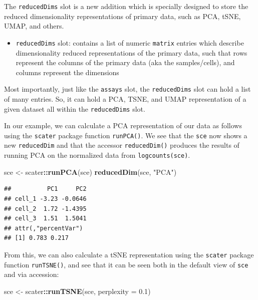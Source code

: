 \documentclass[]{book}
\newenvironment{Shaded}{\begin{snugshade}}{\end{snugshade}}
\newcommand{\DataTypeTok}[1]{\textcolor[rgb]{0.13,0.29,0.53}{#1}}
\newcommand{\FloatTok}[1]{\textcolor[rgb]{0.00,0.00,0.81}{#1}}
\newcommand{\KeywordTok}[1]{\textcolor[rgb]{0.13,0.29,0.53}{\textbf{#1}}}
\newcommand{\NormalTok}[1]{#1}
\newcommand{\OperatorTok}[1]{\textcolor[rgb]{0.81,0.36,0.00}{\textbf{#1}}}
\newcommand{\StringTok}[1]{\textcolor[rgb]{0.31,0.60,0.02}{#1}}
\providecommand{\tightlist}{%
  \setlength{\itemsep}{0pt}\setlength{\parskip}{0pt}}
\begin{document}
The \texttt{reducedDims} slot is a new addition which is specially designed to store the reduced dimensionality representations of primary data, such as PCA, tSNE, UMAP, and others.

\begin{itemize}
\tightlist
\item
  \texttt{reducedDims} slot: contains a list of numeric \texttt{matrix} entries which describe dimensionality reduced representations of the primary data, such that rows represent the columns of the primary data (aka the samples/cells), and columns represent the dimensions
\end{itemize}

Most importantly, just like the \texttt{assays} slot, the \texttt{reducedDims} slot can hold a list of many entries. So, it can hold a PCA, TSNE, and UMAP representation of a given dataset all within the \texttt{reducedDims} slot.

In our example, we can calculate a PCA representation of our data as follows using the \texttt{scater} package function \texttt{runPCA()}. We see that the \texttt{sce} now shows a new \texttt{reducedDim} and that the accessor \texttt{reducedDim()} produces the results of running PCA on the normalized data from \texttt{logcounts(sce)}.

\begin{Shaded}
\begin{Highlighting}[]
\NormalTok{sce <-}\StringTok{ }\NormalTok{scater}\OperatorTok{::}\KeywordTok{runPCA}\NormalTok{(sce)}
\KeywordTok{reducedDim}\NormalTok{(sce, }\StringTok{"PCA"}\NormalTok{)}
\end{Highlighting}
\end{Shaded}

\begin{verbatim}
##          PC1     PC2
## cell_1 -3.23 -0.0646
## cell_2  1.72 -1.4395
## cell_3  1.51  1.5041
## attr(,"percentVar")
## [1] 0.783 0.217
\end{verbatim}

From this, we can also calculate a tSNE representation using the \texttt{scater} package function \texttt{runTSNE()}, and see that it can be seen both in the default view of \texttt{sce} and via accession:

\begin{Shaded}
\begin{Highlighting}[]
\NormalTok{sce <-}\StringTok{ }\NormalTok{scater}\OperatorTok{::}\KeywordTok{runTSNE}\NormalTok{(sce, }\DataTypeTok{perplexity =} \FloatTok{0.1}\NormalTok{)}
\end{Highlighting}
\end{Shaded}
\end{document}
